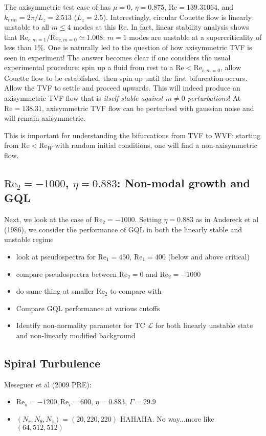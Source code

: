 \documentclass[openacc]{rstransa}%
\newcommand{\Reyn}{\mathrm{Re}}
\newcommand{\Lop}{\mathcal{L}}
\begin{document}
The axisymmetric test case of \cite{1984JFM...146...65M} has $\mu = 0$, $\eta = 0.875$, $\Reyn = 139.31064$, and $k_{min} = 2\pi/L_z = 2.513$ ($L_z = 2.5$). Interestingly, circular Couette flow is linearly unstable to all $m \leq 4$ modes at this $\Reyn$. 
In fact, linear stability analysis shows that $\Reyn_{c,m=1}/\Reyn_{c, m=0} \simeq 1.008$: $m=1$ modes are unstable at a supercriticality of less than 1\%. 
One is naturally led to the question of how axisymmetric TVF is seen in experiment!
The answer becomes clear if one considers the usual experimental procedure: spin up a fluid from rest to a $\Reyn < \Reyn_{c,m=0}$, allow Couette flow to be established, then spin up until the first bifurcation occurs. Allow the TVF to settle and proceed upwards. This will indeed produce an axisymmetric TVF flow that is \emph{itself stable against $m\ne 0$ perturbations}! At $\Reyn = 138.31$, axisymmetric TVF flow can be perturbed with gaussian noise and will remain axisymmetric. 

This is important for understanding the bifurcations from TVF to WVF: starting from $\Reyn < \Reyn_{W}$ with random initial conditions, one will find a non-axisymmetric flow.

\subsection{$\Reyn_2 = -1000$, $\eta = 0.883$: Non-modal growth and GQL}
Next, we look at the case of $\Reyn_2 = -1000$. Setting $\eta = 0.883$ as in Andereck et al (1986), we consider the performance of GQL in both the linearly stable and unstable regime
\begin{itemize}
    \item look at pseudospectra for $\Reyn_1 = 450$, $\Reyn_1 = 400$ (below and above critical)
    \item compare pseudospectra between $\Reyn_2 = 0$ and $\Reyn_2 = -1000$
    \item do same thing at smaller $\Reyn_2$ to compare with \cite{2002PhFl...14.3475H}
    \item Compare GQL performance at various cutoffs
    \item Identify non-normality parameter for TC $\Lop$ for both linearly unstable state and non-linearly modified background
\end{itemize}
\subsection{Spiral Turbulence}
Meseguer et al (2009 PRE): 
\begin{itemize}
    \item $\Reyn_o = -1200, \Reyn_i = 600$, $\eta=0.883$, $\Gamma = 29.9$
    \item $(N_r, N_\theta, N_z) = (20,220,220)$ HAHAHA. No way...more like $(64, 512, 512)$
\end{itemize}
\end{document}

